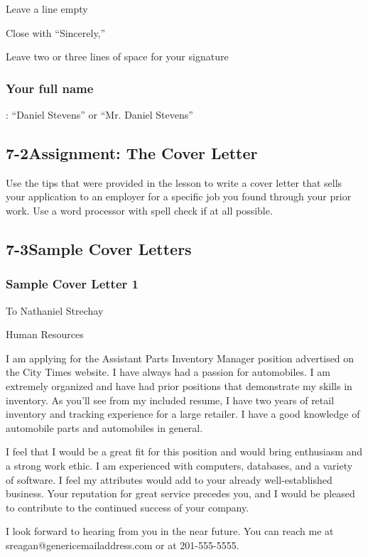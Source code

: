 Leave a line empty

Close with ``Sincerely,''

Leave two or three lines of space for your signature

\subsubsection*{Your full name}: ``Daniel Stevens'' or ``Mr. Daniel Stevens''

\pagebreak \subsection*{7-2\quad Assignment: The Cover Letter}
Use the tips that were provided in the lesson to write a cover letter that sells your application to an employer for a specific job you found through your prior work. Use a word processor with spell check if at all possible.

\pagebreak \subsection*{7-3\quad Sample Cover Letters}
\subsubsection*{Sample Cover Letter 1}

To Nathaniel Strechay

Human Resources

I am applying for the Assistant Parts Inventory Manager position advertised on the City Times website. I have always had a passion for automobiles. I am extremely organized and have had prior positions that demonstrate my skills in inventory. As you'll see from my included resume, I have two years of retail inventory and tracking experience for a large retailer. I have a good knowledge of automobile parts and automobiles in general.

I feel that I would be a great fit for this position and would bring enthusiasm and a strong work ethic. I am experienced with computers, databases, and a variety of software. I feel my attributes would add to your already well-established business. Your reputation for great service precedes you, and I would be pleased to contribute to the continued success of your company.

I look forward to hearing from you in the near future. You can reach me at sreagan@genericemailaddress.com or at 201-555-5555.


